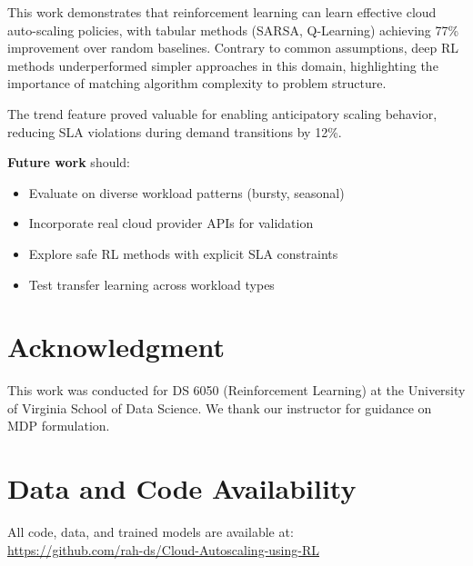 \documentclass[conference]{IEEEtran}
\begin{document}
This work demonstrates that reinforcement learning can learn effective cloud auto-scaling policies, with tabular methods (SARSA, Q-Learning) achieving 77\% improvement over random baselines. Contrary to common assumptions, deep RL methods underperformed simpler approaches in this domain, highlighting the importance of matching algorithm complexity to problem structure.

The trend feature proved valuable for enabling anticipatory scaling behavior, reducing SLA violations during demand transitions by 12\%.

\textbf{Future work} should:
\begin{itemize}
    \item Evaluate on diverse workload patterns (bursty, seasonal)
    \item Incorporate real cloud provider APIs for validation
    \item Explore safe RL methods with explicit SLA constraints
    \item Test transfer learning across workload types
\end{itemize}

\section*{Acknowledgment}
This work was conducted for DS 6050 (Reinforcement Learning) at the University of Virginia School of Data Science. We thank our instructor for guidance on MDP formulation.

\section*{Data and Code Availability}
All code, data, and trained models are available at:\\
\url{https://github.com/rah-ds/Cloud-Autoscaling-using-RL}
\end{document}
